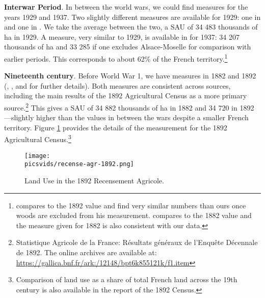 \documentclass[11pt]{report}
\newcommand{\picsvids}{../../output/pics-vids}
\begin{document}
\noindent \textbf{Interwar Period}. In between the world wars, we could find measures for the years 1929 and 1937. Two slightly different measures are available for 1929: one in \cite{toutain1993production} and one in \cite{mauco1937modes}. We take the average between the two, a SAU of 34 483 thousands of ha in 1929.  A measure, very similar to 1929, is available in \cite{auge1945statistiques} for 1937: 34 207 thousands of ha and 33 285 if one excludes Alsace-Moselle for comparison with earlier periods. This corresponds to about 62\% of the French territory.\footnote{\cite{mauco1937modes} compares to the 1892 value and find very similar numbers than ours once woods are excluded from his measurement. \cite{auge1945statistiques} compares to the 1882 value and the measure given for 1882 is also consistent with our data.}

\noindent \textbf{Nineteenth century}. Before World War 1, we have measures in 1882 and 1892 (\cite{mauguin1890statistique}, \cite{flechey1898statistique}, \cite{hitier1899statistique} and \cite{toutain1993production} for further details). Both measures are consistent across sources, including the main results of the 1892 Agricultural Census as a more primary source.\footnote{Statistique Agricole de la France: Résultats généraux de l'Enquête Décennale de 1892. The online archives are available at:  \url{https://gallica.bnf.fr/ark:/12148/bpt6k855121k/f1.item}} This gives a SAU of 34 882 thousands of ha in 1882 and 34 720 in 1892---slightly higher than the values in between the wars despite a smaller French territory. Figure \ref{A-fig:recensement} provides the details of the measurement for the 1892 Agricultural Census.\footnote{Comparison of land use as a share of total French land across the 19th century is also available in the report of the 1892 Census.}

\begin{figure}
	\begin{center}
		\texttt{[image: \\picsvids/recense-agr-1892.png]}
	\end{center}\caption{Land Use in the 1892 Recensement Agricole.\label{A-fig:recensement}}
\end{figure}
\end{document}
